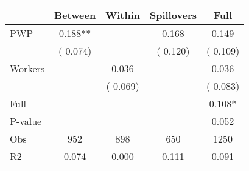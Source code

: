 
\begin{tabular}{l*{4}{c}}\hline&\multicolumn{1}{c}{Between}&\multicolumn{1}{c}{Within}&\multicolumn{1}{c}{Spillovers}&\multicolumn{1}{c}{Full}\\ \hline
 PWP           &              0.188**      &                                               &        0.168 &         0.149                            \\ 
                               &        (       0.074)           &                                       &       (       0.120)     &      (       0.109)                                           \\ 
 Workers       &                                               &        0.036    &                                &             0.036                            \\ 
                               &                                               & (       0.069)                  &                                        &      (       0.083)                                           \\ 
\hline                                                                                                                                                                                                                                            
 Full                  &                                               &                                               &                                        &             0.108*                                     \\ 
 P-value               &                                               &                                               &                                        &             0.052                                           \\ 
 Obs                   &               952               &       898                       &       650                &              1250                                               \\ 
 R2                    &                      0.074              &              0.000                      &              0.111               &                     0.091                                              \\ 
\hline \end{tabular}                                                                                                                                                                                                              